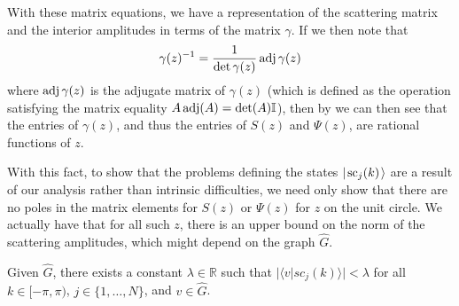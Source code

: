 \documentclass[../thesis-main/thesis-main]{subfiles}
\begin{document}
With these matrix equations, we have a representation of the scattering matrix and the interior amplitudes in terms of the matrix $\gamma$.  If we then note that
\begin{equation}
  \gamma(z)^{-1} = \frac{1}{\det \gamma(z)} \operatorname{adj} \gamma (z)
\end{equation}
where $\operatorname{adj} \gamma (z)$ is the adjugate matrix of $\gamma(z)$ (which is defined as the operation satisfying the matrix equality $A \operatorname{adj}(A) = \det(A)\mathbb{I}$), then by  we can then see that the entries of $\gamma(z)$, and thus the entries of $S(z)$ and $\Psi(z)$, are rational functions of $z$. 

With this fact, to show that the problems defining the states $|\mspace{2mu} \text{sc}_j(k) \mspace{2mu} \rangle$ are a result of our analysis rather than intrinsic difficulties, we need only show that there are no poles in the matrix elements for $S(z)$ or $\Psi(z)$ for $z$ on the unit circle.  We actually have that for all such $z$, there is an upper bound on the norm of the scattering amplitudes, which might depend on the graph $\widehat{G}$.
\begin{lemma}
Given $\widehat{G}$, there exists a constant $\lambda\in\mathbb{R}$ such that $|\langle v|sc_{j}(k)\rangle|<\lambda$ for all $k\in[-\pi,\pi)$, $j\in\{1,\ldots,N\}$, and $v\in\widehat{G}$.
\end{lemma}\label{lem:scattering_state_amplitude_bound}
\end{document}
